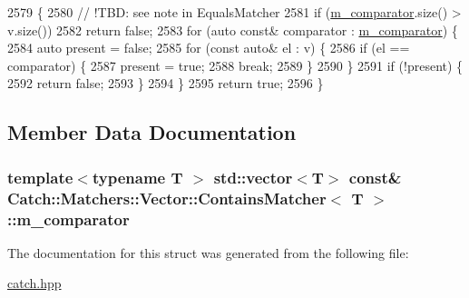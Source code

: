 \begin{DoxyCode}
2579                                                                  \{
2580                     \textcolor{comment}{// !TBD: see note in EqualsMatcher}
2581                     \textcolor{keywordflow}{if} (\hyperlink{struct_catch_1_1_matchers_1_1_vector_1_1_contains_matcher_a83d051166e4ed0d535219ad6ee99abb2}{m\_comparator}.size() > v.size())
2582                         \textcolor{keywordflow}{return} \textcolor{keyword}{false};
2583                     \textcolor{keywordflow}{for} (\textcolor{keyword}{auto} \textcolor{keyword}{const}& comparator : \hyperlink{struct_catch_1_1_matchers_1_1_vector_1_1_contains_matcher_a83d051166e4ed0d535219ad6ee99abb2}{m\_comparator}) \{
2584                         \textcolor{keyword}{auto} present = \textcolor{keyword}{false};
2585                         \textcolor{keywordflow}{for} (\textcolor{keyword}{const} \textcolor{keyword}{auto}& el : v) \{
2586                             \textcolor{keywordflow}{if} (el == comparator) \{
2587                                 present = \textcolor{keyword}{true};
2588                                 \textcolor{keywordflow}{break};
2589                             \}
2590                         \}
2591                         \textcolor{keywordflow}{if} (!present) \{
2592                             \textcolor{keywordflow}{return} \textcolor{keyword}{false};
2593                         \}
2594                     \}
2595                     \textcolor{keywordflow}{return} \textcolor{keyword}{true};
2596                 \}
\end{DoxyCode}


\subsection{Member Data Documentation}
\hypertarget{struct_catch_1_1_matchers_1_1_vector_1_1_contains_matcher_a83d051166e4ed0d535219ad6ee99abb2}{
\subsubsection[{m\-\_\-comparator}]{\setlength{\rightskip}{0pt plus 5cm}template$<$typename T $>$ std\-::vector$<$T$>$ const\& {\bf Catch\-::\-Matchers\-::\-Vector\-::\-Contains\-Matcher}$<$ T $>$\-::m\-\_\-comparator}}\label{struct_catch_1_1_matchers_1_1_vector_1_1_contains_matcher_a83d051166e4ed0d535219ad6ee99abb2}


The documentation for this struct was generated from the following file\-:\begin{DoxyCompactItemize}
\item 
\hyperlink{catch_8hpp}{catch.\-hpp}\end{DoxyCompactItemize}
